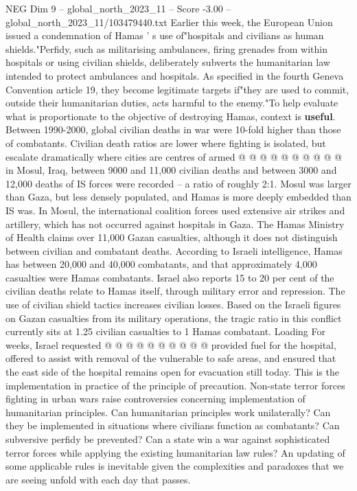 \begin{textsample}{NEG Dim 9 – global\_north\_2023\_11 – Score -3.00 – global\_north\_2023\_11/103479440.txt}
Earlier this week, the European Union issued a condemnation of Hamas ' s use of"hospitals and civilians as human shields."Perfidy, such as militarising ambulances, firing grenades from within hospitals or using civilian shields, deliberately subverts the humanitarian law intended to protect ambulances and hospitals.
As specified in the fourth Geneva Convention article 19, they become legitimate targets if"they are used to commit, outside their humanitarian duties, acts harmful to the enemy."To help evaluate what is proportionate to the objective of destroying Hamas, context is \textbf{useful}.
Between 1990-2000, global civilian deaths in war were 10-fold higher than those of combatants.
Civilian death ratios are lower where fighting is isolated, but escalate dramatically where cities are centres of armed @ @ @ @ @ @ @ @ @ @ in Mosul, Iraq, between 9000 and 11,000 civilian deaths and between 3000 and 12,000 deaths of IS forces were recorded -- a ratio of roughly 2:1.
Mosul was larger than Gaza, but less densely populated, and Hamas is more deeply embedded than IS was.
In Mosul, the international coalition forces used extensive air strikes and artillery, which has not occurred against hospitals in Gaza.
The Hamas Ministry of Health claims over 11,000 Gazan casualties, although it does not distinguish between civilian and combatant deaths.
According to Israeli intelligence, Hamas has between 20,000 and 40,000 combatants, and that approximately 4,000 casualties were Hamas combatants.
Israel also reports 15 to 20 per cent of the civilian deaths relate to Hamas itself, through military error and repression.
The use of civilian shield tactics increases civilian losses.
Based on the Israeli figures on Gazan casualties from its military operations, the tragic ratio in this conflict currently sits at 1.25 civilian casualties to 1 Hamas combatant.
Loading For weeks, Israel requested @ @ @ @ @ @ @ @ @ @ provided fuel for the hospital, offered to assist with removal of the vulnerable to safe areas, and ensured that the east side of the hospital remains open for evacuation still today.
This is the implementation in practice of the principle of precaution.
Non-state terror forces fighting in urban wars raise controversies concerning implementation of humanitarian principles.
Can humanitarian principles work unilaterally?
Can they be implemented in situations where civilians function as combatants?
Can subversive perfidy be prevented?
Can a state win a war against sophisticated terror forces while applying the existing humanitarian law rules?
An updating of some applicable rules is inevitable given the complexities and paradoxes that we are seeing unfold with each day that passes.

\end{textsample}
